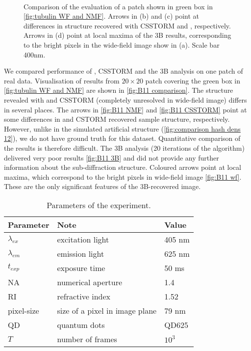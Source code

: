 \begin{figure}[!h]
	\centering
	\newcommand{\sizef}{.95}
	\newcommand{\wf}{.45\textwidth}
	\\
	\caption{Comparison of the evaluation of a patch shown in green box in \autoref{fig:tubulin WF and NMF}. Arrows in (b) and (c) point at differences in structure recovered with CSSTORM and \inmf{}, respectively. Arrows in (d) point at local maxima of the 3B results, corresponding to the bright pixels in the wide-field image show in (a). Scale bar 400\unit{nm}.}
	\label{fig:B11 comparison}
\end{figure}

We compared performance of \inmf{}, CSSTORM and the 3B analysis on one patch of real data. Visualisation of results from $20\times20$ patch covering the green box in \autoref{fig:tubulin WF and NMF} are shown in \autoref{fig:B11 comparison}. The structure revealed with \inmf{} and CSSTORM (completely unresolved in wide-field image) differs in several places. The arrows in \autoref{fig:B11 NMF} and \autoref{fig:B11 CSSTORM}  point at some differences in  \inmf{} and CSTORM recovered sample structure, respectively. However, unlike in the simulated artificial structure (\autoref{fig:comparison hash dens 12}), we do not have ground truth for this dataset. Quantitative comparison of the results is therefore difficult. The 3B analysis (20 iterations of the algorithm) delivered very poor results \autoref{fig:B11 3B} and did not provide any further information about the sub-diffraction structure. Coloured arrows point at local maxima, which correspond to the bright pixels in wide-field image \autoref{fig:B11 wf}. These are the only significant features of the 3B-recovered image.

\begin{table}[!h]	
	\centering
	\begin{tabular}{|l|l|l|}	
		\hline \small
		\bf Parameter & \bf Note  & \bf Value\tabularnewline
		\hline
		$\lambda_{ex}$ & excitation light & 405 nm\tabularnewline
		$\lambda_{em}$ & emission light & 625 nm\tabularnewline
		$t_{exp}$ & exposure time  & 50 ms\tabularnewline
		NA & numerical aperture & 1.4\tabularnewline
		RI & refractive index & 1.52\tabularnewline
		pixel-size & size of a pixel in image plane & 79 nm\tabularnewline
		QD & quantum dots  & QD625\tabularnewline
		$T$ & number of frames  & $10^{3}$\tabularnewline
		\hline
	\end{tabular}
	\caption{Parameters of the experiment.}\label{tab:Parameters of the (a) simulations (b) real data}
	\label{tab:parameters experiment}
\end{table}

